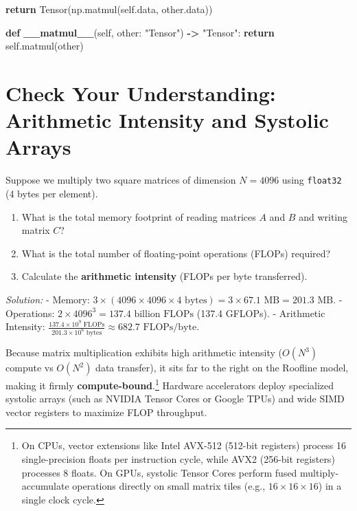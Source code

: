 \documentclass[
  letterpaper,
]{scrbook}
\newenvironment{Shaded}{\begin{snugshade}}{\end{snugshade}}
\newcommand{\ControlFlowTok}[1]{\textcolor[rgb]{0.13,0.29,0.53}{\textbf{#1}}}
\newcommand{\FunctionTok}[1]{\textcolor[rgb]{0.13,0.29,0.53}{\textbf{#1}}}
\newcommand{\KeywordTok}[1]{\textcolor[rgb]{0.13,0.29,0.53}{\textbf{#1}}}
\newcommand{\NormalTok}[1]{#1}
\newcommand{\OperatorTok}[1]{\textcolor[rgb]{0.81,0.36,0.00}{\textbf{#1}}}
\newcommand{\StringTok}[1]{\textcolor[rgb]{0.31,0.60,0.02}{#1}}
\newcommand{\VariableTok}[1]{\textcolor[rgb]{0.00,0.00,0.00}{#1}}
\providecommand{\tightlist}{%
  \setlength{\itemsep}{0pt}\setlength{\parskip}{0pt}}
\begin{document}
\begin{Shaded}
\begin{Highlighting}[]
    \ControlFlowTok{return}\NormalTok{ Tensor(np.matmul(}\VariableTok{self}\NormalTok{.data, other.data))}

\KeywordTok{def} \FunctionTok{\_\_matmul\_\_}\NormalTok{(}\VariableTok{self}\NormalTok{, other: }\StringTok{"Tensor"}\NormalTok{) }\OperatorTok{{-}\textgreater{}} \StringTok{"Tensor"}\NormalTok{:}
    \ControlFlowTok{return} \VariableTok{self}\NormalTok{.matmul(other)}
\end{Highlighting}
\end{Shaded}

\section{Check Your Understanding: Arithmetic Intensity and Systolic
Arrays}\label{check-your-understanding-arithmetic-intensity-and-systolic-arrays}

Suppose we multiply two square matrices of dimension \(N = 4096\) using
\texttt{float32} (4 bytes per element).

\begin{enumerate}
\def\labelenumi{\arabic{enumi}.}
\tightlist
\item
  What is the total memory footprint of reading matrices \(A\) and \(B\)
  and writing matrix \(C\)?
\item
  What is the total number of floating-point operations (FLOPs)
  required?
\item
  Calculate the \textbf{arithmetic intensity} (FLOPs per byte
  transferred).
\end{enumerate}

\emph{Solution:} - Memory:
\(3 \times (4096 \times 4096 \times 4\text{ bytes}) = 3 \times 67.1\text{ MB} = 201.3\text{ MB}\).
- Operations: \(2 \times 4096^3 = 137.4\text{ billion FLOPs}\) (137.4
GFLOPs). - Arithmetic Intensity:
\(\frac{137.4 \times 10^9\text{ FLOPs}}{201.3 \times 10^6\text{ bytes}} \approx 682.7\text{ FLOPs/byte}\).

Because matrix multiplication exhibits high arithmetic intensity
(\(O(N^3)\) compute vs \(O(N^2)\) data transfer), it sits far to the
right on the Roofline model, making it firmly
\textbf{compute-bound}.\footnote{On CPUs, vector extensions like Intel
  AVX-512 (512-bit registers) process 16 single-precision floats per
  instruction cycle, while AVX2 (256-bit registers) processes 8 floats.
  On GPUs, systolic Tensor Cores perform fused multiply-accumulate
  operations directly on small matrix tiles (e.g.,
  \(16 \times 16 \times 16\)) in a single clock cycle.} Hardware
accelerators deploy specialized systolic arrays (such as NVIDIA Tensor
Cores or Google TPUs) and wide SIMD vector registers to maximize FLOP
throughput.
\end{document}
